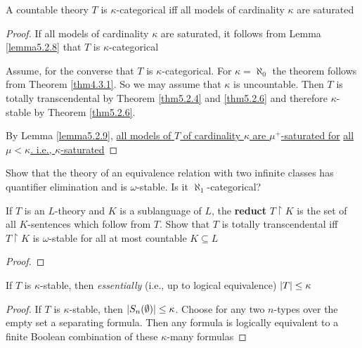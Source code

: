 \documentclass[11pt]{article}
\begin{document}
\begin{theorem}[]
\label{thm5.2.10}
A countable theory \(T\) is \(\kappa\)-categorical iff all models of cardinality \(\kappa\) are saturated
\end{theorem}

\begin{proof}
If all models of cardinality \(\kappa\) are saturated, it follows from Lemma \ref{lemma5.2.8} that \(T\) is
\(\kappa\)-categorical

Assume, for the converse that \(T\) is \(\kappa\)-categorical. For \(\kappa=\aleph_0\) the theorem follows from
Theorem \ref{thm4.3.1}. So we may assume that \(\kappa\) is uncountable. Then \(T\) is totally
transcendental by Theorem \ref{thm5.2.4} and \ref{thm5.2.6} and therefore \(\kappa\)-stable by Theorem
\ref{thm5.2.6}.

By Lemma \ref{lemma5.2.9}, \uline{all models of \(T\) of cardinality \(\kappa\) are \(\mu^+\)-saturated for}
\uline{all \(\mu<\kappa\). i.e., \(\kappa\)-saturated}
\end{proof}



\begin{exercise}
\label{ex5.2.2}
Show that the theory of an equivalence relation with two infinite classes has quantifier
elimination and is \(\omega\)-stable. Is it \(\aleph_1\)-categorical?
\end{exercise}


\begin{exercise}
\label{ex5.2.5}
If \(T\) is an \(L\)-theory and \(K\) is a sublanguage of \(L\), the \textbf{reduct} \(T\restriction K\) is
the set of all \(K\)-sentences which follow from \(T\). Show that \(T\) is totally transcendental
iff \(T\restriction K\) is \(\omega\)-stable for all at most countable \(K\subseteq L\)
\end{exercise}

\begin{proof}

\end{proof}

\begin{exercise}
\label{ex5.2.6}
If \(T\) is \(\kappa\)-stable, then \emph{essentially} (i.e., up to logical equivalence) \(\abs{T}\le\kappa\)
\end{exercise}

\begin{proof}
If \(T\) is \(\kappa\)-stable, then \(\abs{S_n(\emptyset)}\le\kappa\). Choose for any two \(n\)-types over the empty set a
separating formula. Then any formula is logically equivalent to a finite Boolean combination of
these \(\kappa\)-many formulas
\end{proof}
\end{document}
